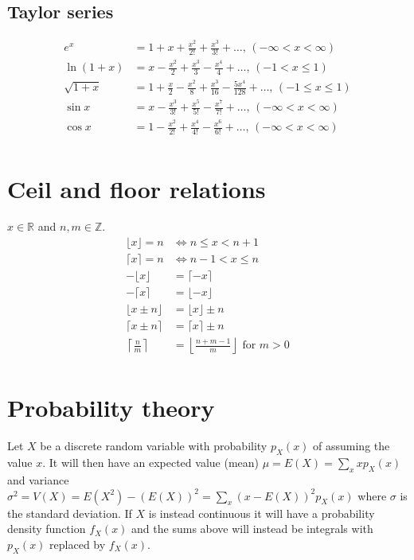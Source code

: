 \subsection{Taylor series}
\begin{align*}
e^x &= 1+x+\frac{x^2}{2!}+\frac{x^3}{3!}+\dots,\,(-\infty<x<\infty)\\
\ln(1+x) &= x-\frac{x^2}{2}+\frac{x^3}{3}-\frac{x^4}{4}+\dots,\,(-1<x\leq1)\\
\sqrt{1+x} &= 1+\frac{x}{2}-\frac{x^2}{8}+\frac{x^3}{16}-\frac{5x^4}{128}+\dots,\,(-1\leq x\leq1)\\
\sin x &= x-\frac{x^3}{3!}+\frac{x^5}{5!}-\frac{x^7}{7!}+\dots,\,(-\infty<x<\infty)\\
\cos x &= 1-\frac{x^2}{2!}+\frac{x^4}{4!}-\frac{x^6}{6!}+\dots,\,(-\infty<x<\infty)\\
\end{align*}

\section{Ceil and floor relations}
$x\in\mathbb R$ and $n,m\in\mathbb Z$.
\begin{align*}
\lfloor x \rfloor = n &\Leftrightarrow n\leq x < n+1\\
\lceil x \rceil = n &\Leftrightarrow n-1< x \leq n\\
-\lfloor x \rfloor & = \lceil -x \rceil\\
-\lceil x \rceil & = \lfloor -x \rfloor\\
\lfloor x\pm n \rfloor & = \lfloor x \rfloor\pm n\\
\lceil x\pm n \rceil & = \lceil x \rceil\pm n\\
\left\lceil \frac nm \right\rceil & = \left\lfloor \frac{n+m-1}{m} \right\rfloor \textrm{ for } m>0\\
\end{align*}

\section{Probability theory}
Let $X$ be a discrete random variable with probability $p_X(x)$ of assuming the value $x$. It will then have an expected value (mean) $\mu=E(X)=\sum_xxp_X(x)$ and variance $\sigma^2=V(X)=E(X^2)-(E(X))^2=\sum_x(x-E(X))^2p_X(x)$ where $\sigma$ is the standard deviation. If $X$ is instead continuous it will have a probability density function $f_X(x)$ and the sums above will instead be integrals with $p_X(x)$ replaced by $f_X(x)$.

